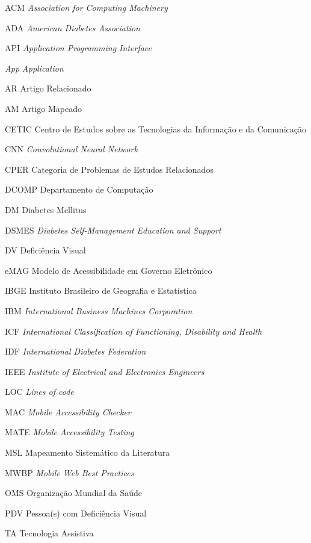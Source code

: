 
\begin{siglas}
	\item[ACM]{\textit{Association for Computing Machinery}}
	\item[ADA]{\textit{American Diabetes Association}}
	\item[API]{\textit{Application Programming Interface}}
	\item[\emph{App}]{\textit{Application}}
	\item[AR]{Artigo Relacionado}
	\item[AM]{Artigo Mapeado}
	\item[CETIC]{Centro de Estudos sobre as Tecnologias da Informação e da Comunicação}
	\item[CNN]{\textit{Convolutional Neural Network}}
	\item[CPER]{Categoria de Problemas de Estudos Relacionados}
	\item[DCOMP]{Departamento de Computação}
	\item[DM]{Diabetes Mellitus}
	\item[DSMES]{\textit{Diabetes Self-Management Education and Support}}
	\item[DV]{Deficiência Visual}
	\item[eMAG]{Modelo de Acessibilidade em Governo Eletrônico}
	\item[IBGE]{Instituto Brasileiro de Geografia e Estatística}
	\item[IBM]{\textit{International Business Machines Corporation}}
	\item[ICF]{\textit{International Classification of Functioning, Disability and Health}}
	\item[IDF]{\textit{International Diabetes Federation}}
	\item[IEEE]{\textit{Institute of Electrical and Electronics Engineers}}
	\item[LOC]{\textit{Lines of code}}
	\item[MAC]{\textit{Mobile Accessibility Checker}}
	\item[MATE]{\textit{Mobile Accessibility Testing}}
	\item[MSL]{Mapeamento Sistemático da Literatura}
	\item[MWBP]{\textit{Mobile Web Best Practices}}
	\item[OMS]{Organização Mundial da Saúde}
	\item[PDV]{Pessoa(s) com Deficiência Visual}
	\item[TA]{Tecnologia Assistiva}

\end{siglas}
